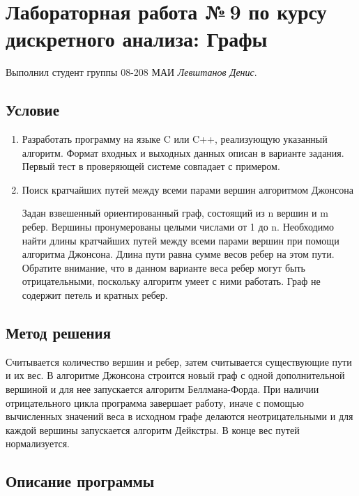 \documentclass[12pt]{article}
\begin{document}
\section*{Лабораторная работа №\,9 по курсу дискретного анализа: Графы}

Выполнил студент группы 08-208 МАИ \textit{Левштанов Денис}.

\subsection*{Условие}

\begin{enumerate}
\item Разработать программу на языке C или C++, реализующую указанный алгоритм. Формат входных и выходных данных описан в варианте задания. Первый тест в проверяющей системе совпадает с примером.
\item Поиск кратчайших путей между всеми парами вершин алгоритмом Джонсона

Задан взвешенный ориентированный граф, состоящий из n вершин и m ребер. Вершины пронумерованы целыми числами от 1 до n. Необходимо найти длины кратчайших путей между всеми парами вершин при помощи алгоритма Джонсона. Длина пути равна сумме весов ребер на этом пути. Обратите внимание, что в данном варианте веса ребер могут быть отрицательными, поскольку алгоритм умеет с ними работать. Граф не содержит петель и кратных ребер.

\end{enumerate}

\subsection*{Метод решения}
\par Считывается количество вершин и ребер, затем считывается существующие пути и их вес. В алгоритме Джонсона строится новый граф с одной дополнительной вершиной и для нее запускается алгоритм Беллмана-Форда. При наличии отрицательного цикла программа завершает работу, иначе с помощью вычисленных значений веса в исходном графе делаются неотрицательными и для каждой вершины запускается алгоритм Дейкстры. В конце вес путей нормализуется.

\subsection*{Описание программы}
\end{document}

